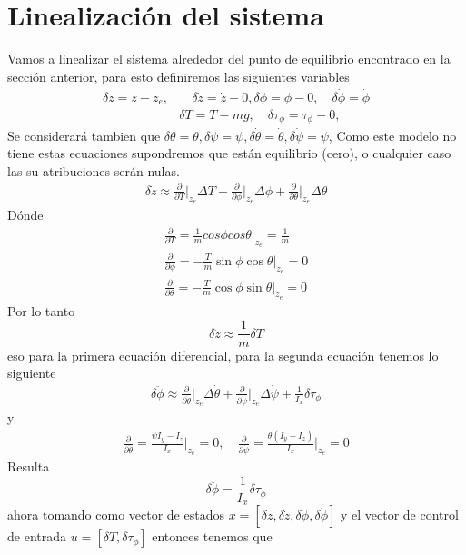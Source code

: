 \documentclass{uofa-eng-assignment}
\begin{document}
\section{Linealización del sistema}
Vamos a linealizar el sistema alrededor del punto de equilibrio encontrado en la sección anterior,
para esto definiremos las siguientes variables
\begin{align*}
    \delta z = z -z_e,& \quad \delta \dot{z}= \dot{z}-0, \delta \phi = \phi - 0, \quad \delta \dot{\phi} = \dot{\phi}\\
&\delta T = T-mg, \quad \delta \tau_\phi = \tau_\phi - 0,
\end{align*}
Se considerará tambien que $\delta \theta = \theta, \delta \psi = \psi, \delta \dot{\theta} = \dot{\theta}, \delta \dot{\psi} = \dot{\psi}$, Como este modelo no tiene estas ecuaciones supondremos que están equilibrio (cero), o cualquier caso las su atribuciones serán nulas.
\begin{align*}
    \delta \dot{z} \approx \frac{\partial}{\partial T}\Big|_{z_e} \Delta T + \frac{\partial}{\partial \phi} \Big|_{z_e} \Delta \phi + \frac{\partial }{\partial \theta} \Big|_{z_e} \Delta \theta 
\end{align*}
Dónde 
\begin{align*}
    \frac{\partial}{\partial T}=\frac{1}{m} cos \phi cos \theta \Big|_{z_e}=\frac{1}{m}\\
    \frac{\partial}{\partial \phi}= -\frac{T}{m} \sin \phi \cos \theta \Big|_{z_e} = 0 \\
    \frac{\partial}{\partial \theta} = -\frac{T}{m} \cos \phi \sin \theta \Big|_{z_e} = 0 
\end{align*}
Por lo tanto
\[
\delta \ddot{z} \approx \frac{1}{m}\delta T
\]
eso para la primera ecuación diferencial, para la segunda ecuación tenemos lo siguiente 
\begin{align*}
    \delta \ddot{\phi} \approx \frac{\partial}{\partial \dot{\theta}} \Big|_{z_e} \Delta \dot{\theta} + \frac{\partial}{\partial \dot{\psi}} \Big|_{z_e} \Delta \dot{\psi} + \frac{1}{I_x} \delta \tau_\phi 
\end{align*}
y 
\begin{align*}
    \frac{\partial}{\partial \dot{\theta}} = \frac{\dot{\psi} I_y-I_z}{I_x}\Big|_{z_e} = 0, \quad \frac{\partial}{\partial \dot{\psi}}= \frac{\dot{\theta}(I_y-I_z)}{I_x}\Big|_{z_e} = 0  
\end{align*}
Resulta \[
\delta \ddot{\phi} = \frac{1}{I_x} \delta \tau_\phi\]
ahora tomando como vector de estados $x=[\delta z, \delta \dot{z}, \delta \phi, \delta \dot{\phi}]$ y el vector de control de entrada $u=[\delta T, \delta \tau_\phi]$ entonces tenemos que
\end{document}
